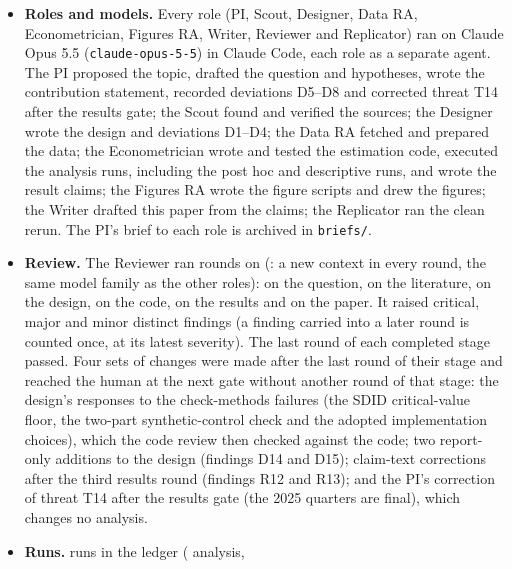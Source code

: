 \begin{itemize}
  \item \textbf{Roles and models.} Every role (PI, Scout, Designer, Data RA, Econometrician,
        Figures RA, Writer, Reviewer and Replicator) ran on Claude Opus 5.5
        (\texttt{claude-opus-5-5}) in Claude Code, each role as a separate agent. The PI
        proposed the topic, drafted the question and hypotheses, wrote the contribution
        statement, recorded deviations D5--D8 and corrected threat T14 after the results
        gate; the Scout found and verified the sources; the Designer wrote the design and
        deviations D1--D4; the Data RA fetched and prepared the data; the Econometrician
        wrote and tested the estimation code, executed the analysis runs, including the
        post hoc and descriptive runs, and wrote the result claims; the Figures RA wrote the figure scripts
        and drew the figures; the Writer drafted this paper from the claims; the Replicator
        ran the clean rerun. The PI's brief to each role is archived in \texttt{briefs/}.
  \item \textbf{Review.} The Reviewer ran \CrewReviewRounds{} rounds on
        \CrewReviewerModels{} (\CrewReviewIndependence{}: a new context in every round, the
        same model family as the other roles): \CrewRoundsQuestion{} on the question,
        \CrewRoundsLiterature{} on the literature, \CrewRoundsDesign{} on the design,
        \CrewRoundsCode{} on the code, \CrewRoundsResults{} on the results and
        \CrewRoundsPaper{} on the paper. It raised \CrewFindingsCritical{} critical,
        \CrewFindingsMajor{} major and \CrewFindingsMinor{} minor distinct findings (a
        finding carried into a later round is counted once, at its latest severity). The
        last round of each completed stage passed. Four sets of changes were made after
        the last round of their stage and reached the human at the next gate without
        another round of that stage: the design's responses to the check-methods failures
        (the SDID critical-value floor, the two-part synthetic-control check and the
        adopted implementation choices), which the code review then checked against the
        code; two report-only additions to the design (findings D14 and D15); claim-text corrections after the third results round (findings R12 and R13); and
        the PI's correction of threat T14 after the results gate (the 2025 quarters are final), which changes no analysis.
  \item \textbf{Runs.} \CrewRuns{} runs in the ledger (\CrewRunsAnalysis{} analysis,

\end{itemize}

